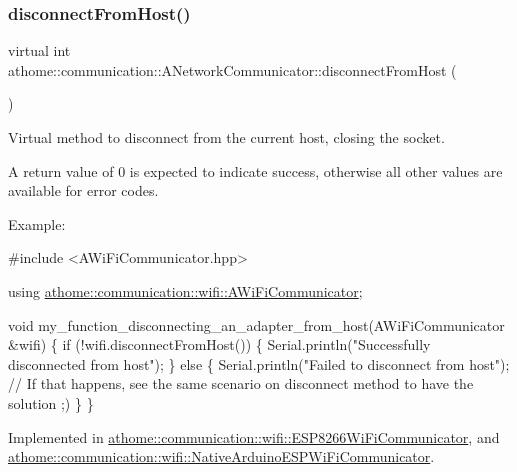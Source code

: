 \subsubsection{\texorpdfstring{disconnect\+From\+Host()}{disconnectFromHost()}}
{\footnotesize\ttfamily virtual int athome\+::communication\+::\+A\+Network\+Communicator\+::disconnect\+From\+Host (\begin{DoxyParamCaption}{ }\end{DoxyParamCaption})\hspace{0.3cm}{\ttfamily [pure virtual]}}

Virtual method to disconnect from the current host, closing the socket.

A return value of 0 is expected to indicate success, otherwise all other values are available for error codes.

Example\+:


\begin{DoxyCode}
\textcolor{preprocessor}{#include <AWiFiCommunicator.hpp>}

\textcolor{keyword}{using} \mbox{\hyperlink{classathome_1_1communication_1_1wifi_1_1_a_wi_fi_communicator}{athome::communication::wifi::AWiFiCommunicator}};

\textcolor{keywordtype}{void} my\_function\_disconnecting\_an\_adapter\_from\_host(AWiFiCommunicator
&wifi) \{ \textcolor{keywordflow}{if} (!wifi.disconnectFromHost()) \{ Serial.println(\textcolor{stringliteral}{"Successfully}
\textcolor{stringliteral}{disconnected from host"}); \} \textcolor{keywordflow}{else} \{ Serial.println(\textcolor{stringliteral}{"Failed to disconnect}
\textcolor{stringliteral}{from host"}); \textcolor{comment}{// If that happens, see the same scenario on disconnect method}
to have the solution ;)
  \}
\}
\end{DoxyCode}
 

Implemented in \mbox{\hyperlink{classathome_1_1communication_1_1wifi_1_1_e_s_p8266_wi_fi_communicator_a0f8adbe1b1d219148c4f340980056356}{athome\+::communication\+::wifi\+::\+E\+S\+P8266\+Wi\+Fi\+Communicator}}, and \mbox{\hyperlink{classathome_1_1communication_1_1wifi_1_1_native_arduino_e_s_p_wi_fi_communicator_a8fa44a5078cb7d61f01b306e1d0d1bfe}{athome\+::communication\+::wifi\+::\+Native\+Arduino\+E\+S\+P\+Wi\+Fi\+Communicator}}.

\mbox{\label{classathome_1_1communication_1_1_a_network_communicator_a5e3b278ad11e6c00ac7d3e2fee3f01b1}} 
